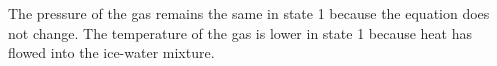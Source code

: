 The pressure of the gas remains the same in state 1 because the equation does not change.  
The temperature of the gas is lower in state 1 because heat has flowed into the ice-water mixture.